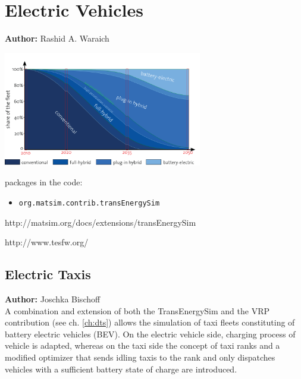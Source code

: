 \chapter{Electric Vehicles }
\label{ch:elvehicles}

\hfill \textbf{Author:} Rashid A. Waraich

\begin{center} \includegraphics[width=0.65\textwidth, angle=0]{extending/figures/Elvehicles/main.png} \end{center}


\citet[][]{WaraichEtAl_TRR_2013, GalusEtAl_STRC_2009, WaraichEtAl_IATBR_2009, GalusEtAl_ITSG_2012, Waraich_PhDThesis_2014, AbedinWaraich_TechRep_IVT_2013, WaraichEtAl_TechRep_IVT_2013, GalusEtAl_ResRep_EWZ_2012, Waraich_unpub_EURO_2012, Waraich_unpub_MATSimUserMeeting_2012, WaraichEtAl_JanssensEtAl_2014, WaraichAxhausen_SDEWES_2013}

packages in the code:
\begin{itemize}
	\item \lstinline|org.matsim.contrib.transEnergySim|
\end{itemize}

http://matsim.org/docs/extensions/transEnergySim

http://www.tesfw.org/
\section{Electric Taxis} 
\hfill \textbf{Author:} Joschka Bischoff\\
A combination and extension of both the TransEnergySim and the VRP contribution (see ch. \ref{ch:dts}) allows the simulation of taxi fleets constituting of battery electric vehicles (BEV).
On the electric vehicle side, charging process of vehicle is adapted, whereas on the taxi side the concept of taxi ranks and a modified optimizer that sends idling taxis to the rank and only dispatches vehicles with a sufficient battery state of charge are introduced. 
